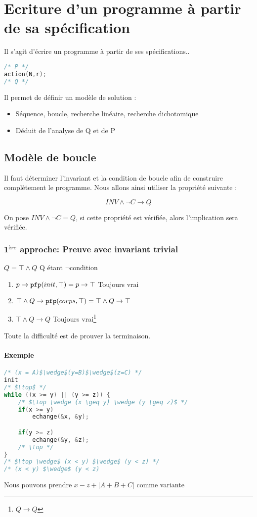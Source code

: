 \chapter{Ecriture d'un programme à partir de sa spécification}
\minitoc
Il s'agit d'écrire un programme à partir de ses spécifications..
\begin{lstlisting}[language=C, numbers=none]
/* P */
action(N,r);
/* Q */
\end{lstlisting}
Il permet de définir un modèle de solution : 
\begin{itemize}
	\item Séquence, boucle, recherche linéaire, recherche dichotomique
	\item Déduit de l'analyse de Q et de P
\end{itemize}

\section{Modèle de boucle}
	Il faut déterminer l'invariant et la condition de boucle afin de construire complètement le programme. Nous allons ainsi utiliser la propriété suivante : 

	$$ INV \wedge \neg C \rightarrow Q $$

	On pose $INV \wedge \neg C = Q$, si cette propriété est vérifiée, alors l'implication sera vérifiée.

	\subsection{1$^{ère}$ approche: Preuve avec invariant trivial}
	$Q = \top \wedge Q$ Q étant $\neg$condition 
	\begin{enumerate}
		\item $p \rightarrow \texttt{pfp} (init , \top) = p \rightarrow \top$ Toujours vrai
		\item $\top \wedge Q \rightarrow \texttt{pfp}(corps, \top) = \top \wedge Q \rightarrow \top$
		\item $\top \wedge Q \rightarrow Q$ Toujours vrai\footnote{$Q\rightarrow Q$} 
	\end{enumerate}
	Toute la difficulté est de prouver la terminaison.
	\subsubsection{Exemple}
	\begin{lstlisting}[language=C]
/* (x = A)$\wedge$(y=B)$\wedge$(z=C) */
init
/* $\top$ */
while ((x >= y) || (y >= z)) {
	/* $\top \wedge (x \geq y) \wedge (y \geq z)$ */
	if(x >= y) 
		echange(&x, &y);

	if(y >= z) 
		echange(&y, &z);
	/* \top */
}
/* $\top \wedge$ (x < y) $\wedge$ (y < z) */
/* (x < y) $\wedge$ (y < z)
	\end{lstlisting}
	Nous pouvons prendre $x-z + |A+B+C|$ comme variante


